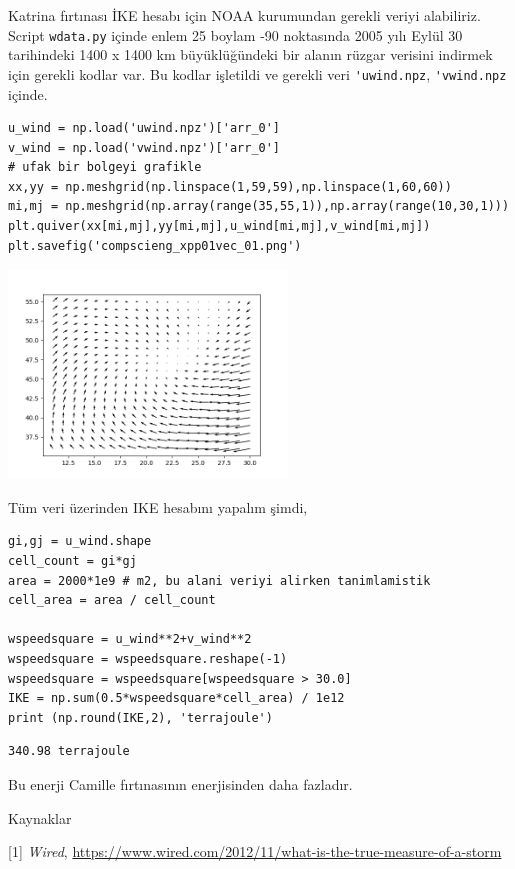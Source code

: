 \documentclass[12pt,fleqn]{article}\usepackage{../../common}
\begin{document}
Katrina fırtınası İKE hesabı için NOAA kurumundan gerekli veriyi alabiliriz.
Script \verb!wdata.py! içinde enlem 25 boylam -90 noktasında 2005 yılı
Eylül 30 tarihindeki 1400 x 1400 km büyüklüğündeki bir alanın rüzgar verisini
indirmek için gerekli kodlar var. Bu kodlar işletildi ve gerekli veri
\verb!'uwind.npz!, \verb!'vwind.npz! içinde.

\begin{verbatim}
u_wind = np.load('uwind.npz')['arr_0']
v_wind = np.load('vwind.npz')['arr_0']
# ufak bir bolgeyi grafikle
xx,yy = np.meshgrid(np.linspace(1,59,59),np.linspace(1,60,60))
mi,mj = np.meshgrid(np.array(range(35,55,1)),np.array(range(10,30,1)))
plt.quiver(xx[mi,mj],yy[mi,mj],u_wind[mi,mj],v_wind[mi,mj])
plt.savefig('compscieng_xpp01vec_01.png')
\end{verbatim}

\includegraphics[width=20em]{compscieng_xpp01vec_01.png}

Tüm veri üzerinden IKE hesabını yapalım şimdi,

\begin{verbatim}
gi,gj = u_wind.shape
cell_count = gi*gj
area = 2000*1e9 # m2, bu alani veriyi alirken tanimlamistik
cell_area = area / cell_count

wspeedsquare = u_wind**2+v_wind**2
wspeedsquare = wspeedsquare.reshape(-1)
wspeedsquare = wspeedsquare[wspeedsquare > 30.0]
IKE = np.sum(0.5*wspeedsquare*cell_area) / 1e12
print (np.round(IKE,2), 'terrajoule')
\end{verbatim}

\begin{verbatim}
340.98 terrajoule
\end{verbatim}

Bu enerji Camille fırtınasının enerjisinden daha fazladır. 


Kaynaklar

[1] {\em Wired}, \url{https://www.wired.com/2012/11/what-is-the-true-measure-of-a-storm}
\end{document}
